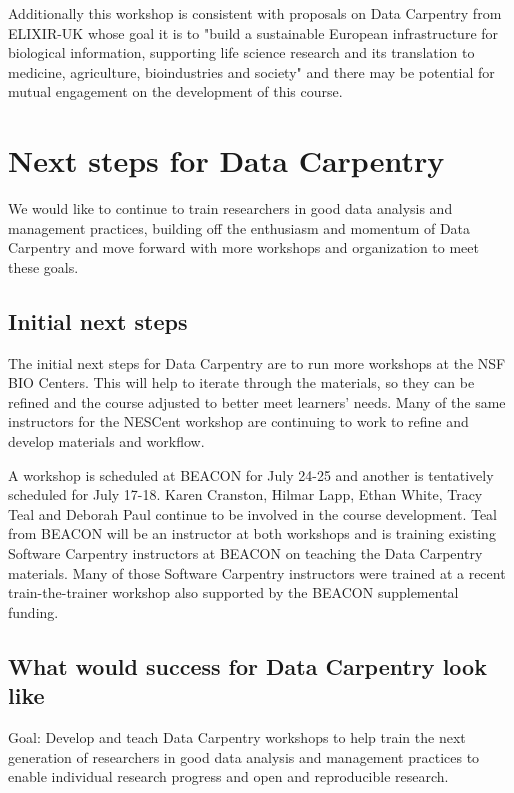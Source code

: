 \documentclass[11pt]{article}
\begin{document}
Additionally this workshop is consistent with proposals on Data Carpentry from ELIXIR-UK whose goal it is to "build a sustainable European infrastructure for biological information, supporting life science research and its translation to medicine, agriculture, bioindustries and society" and there may be potential for mutual engagement on the development of this course. 

\section{Next steps for Data Carpentry}

We would like to continue to train researchers in good data analysis and management practices, building off the enthusiasm and momentum of Data Carpentry and move forward with more workshops and organization to meet 
these goals.

\subsection{Initial next steps}

The initial next steps for Data Carpentry are to run more workshops at the NSF BIO Centers. This will help to 
iterate through the materials, so they can be refined and the course adjusted to better meet learners' needs. Many of the same instructors for the NESCent workshop are continuing to work to refine and develop materials and workflow.

A workshop is scheduled at BEACON for July 24-25 and another is tentatively scheduled for July 17-18. Karen Cranston, Hilmar Lapp, Ethan White, Tracy Teal and Deborah Paul continue to be involved in the course development. Teal from BEACON will be an instructor at both workshops and is training existing Software Carpentry instructors at BEACON on teaching the Data Carpentry materials. Many of those Software Carpentry instructors were trained at a recent train-the-trainer workshop also supported by the BEACON supplemental funding. 

\subsection{What would success for Data Carpentry look like}

\hangindent=0.7cm Goal: Develop and teach Data Carpentry workshops to help train the next generation of researchers in good data analysis and management practices to enable individual research progress and open and reproducible research. 
\end{document}
